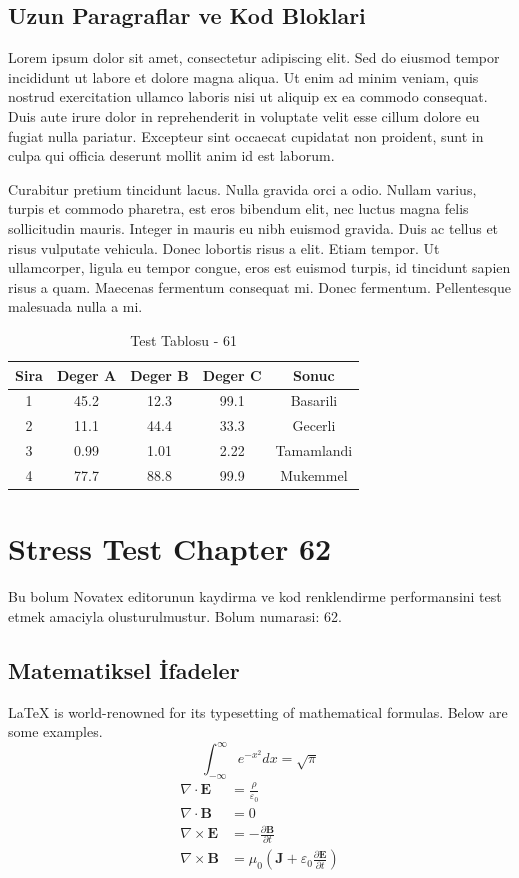 \documentclass[12pt,a4paper]{article}
\begin{document}
\subsection{Uzun Paragraflar ve Kod Bloklari}
Lorem ipsum dolor sit amet, consectetur adipiscing elit. Sed do eiusmod tempor incididunt ut labore et dolore magna aliqua. Ut enim ad minim veniam, quis nostrud exercitation ullamco laboris nisi ut aliquip ex ea commodo consequat. Duis aute irure dolor in reprehenderit in voluptate velit esse cillum dolore eu fugiat nulla pariatur. Excepteur sint occaecat cupidatat non proident, sunt in culpa qui officia deserunt mollit anim id est laborum.

Curabitur pretium tincidunt lacus. Nulla gravida orci a odio. Nullam varius, turpis et commodo pharetra, est eros bibendum elit, nec luctus magna felis sollicitudin mauris. Integer in mauris eu nibh euismod gravida. Duis ac tellus et risus vulputate vehicula. Donec lobortis risus a elit. Etiam tempor. Ut ullamcorper, ligula eu tempor congue, eros est euismod turpis, id tincidunt sapien risus a quam. Maecenas fermentum consequat mi. Donec fermentum. Pellentesque malesuada nulla a mi.

\begin{table}[h!]
\centering
\begin{tabular}{|c|c|c|c|c|}
\hline
\textbf{Sira} & \textbf{Deger A} & \textbf{Deger B} & \textbf{Deger C} & \textbf{Sonuc} \\
\hline
1 & 45.2 & 12.3 & 99.1 & Basarili \\
2 & 11.1 & 44.4 & 33.3 & Gecerli \\
3 & 0.99 & 1.01 & 2.22 & Tamamlandi \\
4 & 77.7 & 88.8 & 99.9 & Mukemmel \\
\hline
\end{tabular}
\caption{Test Tablosu - 61}
\end{table}

\newpage
\section{Stress Test Chapter 62}
Bu bolum Novatex editorunun kaydirma ve kod renklendirme performansini test etmek amaciyla olusturulmustur. Bolum numarasi: 62.

\subsection{Matematiksel İfadeler}
\LaTeX{} is world-renowned for its typesetting of mathematical formulas. Below are some examples.
\begin{equation}
\int_{-\infty}^{\infty} e^{-x^2} dx = \sqrt{\pi}
\end{equation}
\begin{align}
\nabla \cdot \mathbf{E} &= \frac{\rho}{\varepsilon_0} \\
\nabla \cdot \mathbf{B} &= 0 \\
\nabla \times \mathbf{E} &= -\frac{\partial \mathbf{B}}{\partial t} \\
\nabla \times \mathbf{B} &= \mu_0\left(\mathbf{J} + \varepsilon_0 \frac{\partial \mathbf{E}}{\partial t}\right)
\end{align}
\end{document}

